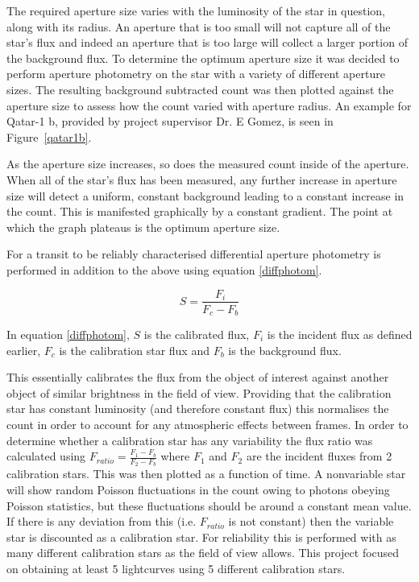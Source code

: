 \documentclass{report}
\begin{document}
The required aperture size varies with the luminosity of the star in question, along with its radius. An aperture that is too small will not capture all of the star's flux and indeed an aperture that is too large will collect a larger portion of the background flux. To determine the optimum aperture size it was decided to perform aperture photometry on the star with a variety of different aperture sizes.  The resulting background subtracted count was then plotted against the aperture size to assess how the count varied with aperture radius. An example for Qatar-1 b, provided by project supervisor Dr. E Gomez, is seen in Figure~\ref{qatar1b}.

As the aperture size increases, so does the measured count inside of the aperture. When all of the star's flux has been measured, any further increase in aperture size will detect a uniform, constant background leading to a constant increase in the count. This is manifested graphically by a constant gradient. The point at which the graph plateaus is the optimum aperture size.

For a transit to be reliably characterised differential aperture photometry is performed in addition to the above using equation \ref{diffphotom}. 

\begin{equation} \label{diffphotom}
    S = \frac{F_{i}}{F_{c}-F_{b}}
\end{equation}

In equation \ref{diffphotom}, $S$ is the calibrated flux, $F_{i}$ is the incident flux as defined earlier, $F_{c}$ is the calibration star flux and $F_{b}$ is the background flux.

This essentially calibrates the flux from the object of interest against another object of similar brightness in the field of view. Providing that the calibration star has constant luminosity (and therefore constant flux) this normalises the count in order to account for any atmospheric effects between frames. In order to determine whether a calibration star has any variability the flux ratio was calculated using $F_{ratio} = \frac{F_{1} - F_{b}}{F_{2}-F_{b}}$ where $F_{1}$ and $F_{2}$ are the incident fluxes from 2 calibration stars. This was then plotted as a function of time. A nonvariable star will show random Poisson fluctuations in the count owing to photons obeying Poisson statistics, but these fluctuations should be around a constant mean value. If there is any deviation from this (i.e. $F_{ratio}$ is not constant) then the variable star is discounted as a calibration star. For reliability this is performed with as many different calibration stars as the field of view allows. This project focused on obtaining at least 5 lightcurves using 5 different calibration stars. 
\end{document}

